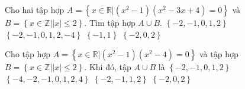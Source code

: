 \begin{ex}%
	Cho hai tập hợp $A=\left\{ x\in \mathbb{R}\big|\left(x^2-1 \right)\left( x^2-3x+4 \right)=0 \right\}$ và $B=\left\{ x\in \mathbb{Z}\big|\left| x \right|\leq 2 \right\}$. Tìm tập hợp $A\cup B$.
	\choice
	{\True $\left\{ -2,-1,0,1,2 \right\}$}
	{$\left\{ -2,-1,0,1,2, -4 \right\}$}
	{$\left\{-1, 1 \right\}$}
	{$\left\{-2, 0, 2\right\}$}
\end{ex}

\begin{ex}%
	Cho tập hợp $A =\left\{x \in \mathbb{R} \big| (x^2 -1)(x^2 - 4) = 0\right\}$ và tập hợp $B = \left\{x \in \mathbb{Z} \big| |x| \leq 2 \right\}$. Khi đó, tập $A \cup B$ là
	\choice
	{\True $\left\{-2, -1, 0, 1, 2\right\}$}
	{$\left\{-4, -2, -1, 0, 1, 2, 4\right\}$}
	{$\left\{-2, -1, 1, 2\right\}$}
	{$\left\{-2, 0, 2\right\}$}
\end{ex} 
